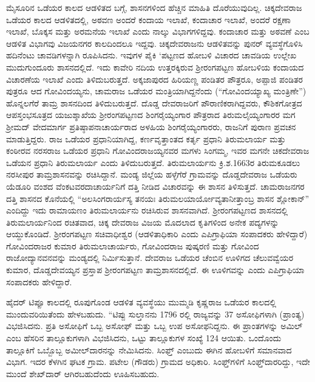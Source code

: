 ಮೈಸೂರಿನ ಒಡೆಯರ ಕಾಲದ ಆಡಳಿತದ ಬಗ್ಗೆ, ಶಾಸನಗಳಿಂದ ಹೆಚ್ಚಿನ ಮಾಹಿತಿ ದೊರೆಯುವುದಿಲ್ಲ. ಚಿಕ್ಕದೇವರಾಜ ಒಡೆಯರ ಕಾಲದ ಆಡಳಿತದಲ್ಲಿ, ಅಠವಣ ಅಂದರೆ ಕಂದಾಯ ಇಲಾಖೆ, ಕಂದಾಚಾರ ಇಲಾಖೆ, ಅಂದರೆ ರಕ್ಷಣಾ ಇಲಾಖೆ, ಬೊಕ್ಕಸ ಮತ್ತು ಅರಮನೆಯ ಇಲಾಖೆ ಎಂದು ನಾಲ್ಕು ವಿಭಾಗಗಳಿದ್ದವು. ಕಂದಾಚಾರ ಮತ್ತು ಅಠವಣೆ ಎಂಬ ಆಡಳಿತ ವಿಭಾಗವು ವಿಜಯನಗರ ಕಾಲದಿಂದಲೂ ಇದ್ದವು. ಚಿಕ್ಕದೇವರಾಜನು ಆಡಳಿತವನ್ನು ಪುನರ್​ ವ್ಯವಸ್ಥೆಗೊಳಿಸಿ ಹದಿನೆಂಟು ಚಾವಡಿಗಳನ್ನಾಗಿ ರೂಪಿಸಿದನು. ಇವುಗಳ ಪೈಕಿ ‘ಪಟ್ಟಣದ ಹೋಬಳಿ ವಿಚಾರದ ಚಾವಡಿಯ ಉಲ್ಲೇಖ ಮುದುಗುಂದೂರು ಶಾಸನದಲ್ಲಿದೆ. ಇದು ಕಾವೇರಿ ನದಿಯ ಉತ್ತರಕ್ಕಿರುವ ಶ‍್ರೀರಂಗಪಟ್ಟಣ ಹೋಬಳಿಯ ಕಂದಾಯದ ವಿಚಾರಣೆಯ ಇಲಾಖೆ ಎಂದು ತಿಳಿದುಬರುತ್ತದೆ. ಅಕ್ಕಜಾಪುರದ ಹಿರಿಯಣ್ಣ ಪಂಡಿತರ ಪೌತ್ರರೂ, ಅಪ್ಪಾಜಿ ಪಂಡಿತರ ಪುತ್ರರೂ ಆದ ಗೋವಿಂದಯ್ಯನು, ಚಾಮರಾಜ ಒಡೆಯರ ಮಂತ್ರಿಯಾಗಿದ್ದನೆಂದು (“ಗೋವಿಂದಯ್ಯಾಖ್ಯ ಮಂತ್ರಿಣೇ”) ಹೊನ್ನಲಗೆರೆ ತಾಮ್ರ ಶಾಸನದಿಂದ ತಿಳಿದುಬರುತ್ತದೆ. ದೊಡ್ಡ ದೇವರಾಜರಿಗೆ ಪೌರಾಣಿಕರಾಗಿದ್ದವರು, ಕೌಶಿಕಗೋತ್ರದ ಆಪಸ್ತಂಭಸೂತ್ರದ ಯಜುಶ್ಶಾಖೆಯ ಶ‍್ರೀರಂಗಪಟ್ಟಣದ ಶಿಂಗರೈಯ್ಯಂಗಾರ ಪೌತ್ರರಾದ ತಿರುಮಲೈಯ್ಯಂಗಾರರ ಮಗ ಶ‍್ರೀಮದ್​ ವೇದಮಾರ್ಗ ಪ್ರತಿಷ್ಠಾಪನಾಚಾರ್ಯರಾದ ಅಳಹಿಯ ಶಿಂಗರೈಯ್ಯಂಗಾರರು, ರಾಜನಿಗೆ ಪುರಾಣ ಪ್ರವಚನ ಮಾಡುತ್ತಿದ್ದರು. ರಾಜ ಒಡೆಯರ ಪ್ರಧಾನಿಯಾಗಿದ್ದ, ಕರ್ಣವೃತ್ತಾಂತದ ಕರ್ತೃ ಪ್ರಧಾನಿ ತಿರುಮಲಾರ್ಯ ಮತ್ತು ಕಂಠೀರವ ನರಸರಾಜ ಒಡೆಯರ ಪ್ರಧಾನಿ ಗೋವಿಂದರಾಜಯ್ಯನವರ ಮಗಳು ಸಿಂಗಮ್ಮ, ಇವರ ಮಗನೇ ಚಿಕದೇವರಾಜ ಒಡೆಯನ ಪ್ರಧಾನಿ ತಿರುಮಲಾರ್ಯ ಎಂದು ತಿಳಿದುಬರುತ್ತದೆ. ತಿರುಮಲಾರ್ಯನು ಕ್ರಿ.ಶ.1663ರ ತಿರುಮಕೂಡಲು ನರಸೀಪುರ ತಾಮ್ರಶಾಸನವನ್ನು ರಚಿಸಿದ್ದಾನೆ. ಮಂಡ್ಯ ಜಿಲ್ಲೆಯ ಹಳ್ಳೆಗೆರೆ ಗ್ರಾಮವನ್ನು ದೊಡ್ಡದೇವರಾಜ ಒಡೆಯರು ಯೆಡೂರಿ ವಂಶದ ವೆಂಕಟವರದಾಚಾರ್ಯನಿಗೆ ದತ್ತಿ ನೀಡಿದ ವಿಚಾರವನ್ನು ಈ ಶಾಸನ ತಿಳಿಸುತ್ತದೆ. ಚಾಮರಾಜನಗರ ದತ್ತಿ ಶಾಸನದ ಕೊನೆಯಲ್ಲಿ “ಅಲಸಿಂಗರಾರ್ಯಸ್ಯ ತನಯಃ ತಿರುಮಲಯಾರ್ಯೋವ್ಯತಾನೀತ್ತಾಂಬ್ರ ಶಾಸನ ಶ್ಲೋಕಾನ್​” ಎಂದಿದ್ದು ಇದು ರಾಮಾಯಣಂ ತಿರುಮಲಾರ್ಯನು ರಚಿಸಿರುವ ಶಾಸನವಾಗಿದೆ. ಶ‍್ರೀರಂಗಪಟ್ಟಣದ ಶಾಸನದಲ್ಲಿ ತಿರುಮಲಾರ್ಯನಿಂದ ರಚಿತವಾದ, ಚಿಕ್ಕ ದೇವರಾಜ ವಿಜಯ ಮೊದಲಾದ ಕೃತಿಗಳಿಂದ ಅನೇಕ ಪದ್ಯಗಳನ್ನು ಆಯ್ದುಕೊಂಡಿದೆ. ಶ‍್ರೀರಂಗಪಟ್ಟಣ ಸಚಿವಾಧೀಶ್ವರ (ಆಡಳಿತಾಧಿಕಾರಿ ಎಂದು ಎಪಿಗ್ರಾಫಿಯಾ ಸಂಪಾದಕರು ಹೇಳಿದ್ದಾರೆ) ಗೋವಿಂದರಾಜರ ಕುಮಾರ ತಿರುಮಲಾಚಾರ್ಯರು, ಗೋವಿಂದರಾಜ ಪುಷ್ಕರಣಿ ಮತ್ತು ಗೋವಿಂದ ರಾಜೋದ್ಯಾನವನವನ್ನು ಮಂಡ್ಯದಲ್ಲಿ ನಿರ್ಮಿಸುತ್ತಾನೆ. ದೇವರಾಜ ಒಡೆಯರ ಚೆಂಬಿನ ಊಳಿಗದ ಚೆಲುವವ್ವೆಯರ ಕುಮಾರ, ದೊಡ್ಡದೇವಯ್ಯನ ಪ್ರಸ್ತಾಪ ಶ‍್ರೀರಂಗಪಟ್ಟಣ ತಾಮ್ರಶಾಸನದಲ್ಲಿದೆ. ಈ ಊಳಿಗವನ್ನು  ಎಂದು ಎಪಿಗ್ರಾಫಿಯಾ ಸಂಪಾದಕರು ಹೇಳಿದ್ದಾರೆ.

ಹೈದರ್​ ಟಿಪ್ಪೂ ಕಾಲದಲ್ಲಿ ರೂಪುಗೊಂಡ ಆಡಳಿತ ವ್ಯವಸ್ಥೆಯು ಮುಮ್ಮಡಿ ಕೃಷ್ಣರಾಜ ಒಡೆಯರ ಕಾಲದಲ್ಲಿ ಮುಂದುವರಿಯಿ\-ತೆಂದು ಹೇಳಬಹುದು. “ಟಿಪ್ಪು ಸುಲ್ತಾನನು 1796 ರಲ್ಲಿ ರಾಜ್ಯವನ್ನು 37 ಅಸೋಫಿಗಳಾಗಿ (ಪ್ರಾಂತ್ಯ) ವಿಭಜಿಸಿದನು. ಪ್ರತಿ ಅಸೋಫಿಗೆ ಒಬ್ಬ ಅಸೋಫ್​ ಮತ್ತು ಒಬ್ಬ ಉಪ ಅಸೋಫನಿದ್ದನು. ಈ ಪ್ರಾಂತಗಳನ್ನು ಅಮಿಲ್​ ಎಂಬ ಹೆಸರಿನ ತಾಲ್ಲೂಕುಗಳಾಗಿ ವಿಭಜಿಸಿದನು, ಒಟ್ಟು ತಾಲ್ಲೂಕುಗಳ ಸಂಖ್ಯೆ 124 ಆಯಿತು. ಒಂದೊಂದು ತಾಲ್ಲೂಕಿಗೆ ಒಬ್ಬೊಬ್ಬ ಅಮೀಲ್​ದಾರನನ್ನು ನೇಮಿಸಿದನು. ಸಿಂಫ್ತ್​ ಎಂಬುದು ಈಗಿನ ಹೋಬಳಿಗೆ ಸಮಾನವಾದ ವಿಭಾಗ. ಇದರ ಕೆಳಗಿನ ಘಟಕ ಗ್ರಾಮ. ಪಟೇಲ (ಗೌಡರು) ಗ್ರಾಮದ ಅಧಿಕಾರಿ. ಸಿಂಫ್ತ್​ಗಳಿಗೆ ಸಿಂಫ್ತ್​ದಾರರಿದ್ದು, ಇದೇ ಮುಂದೆ ಶೇಖ್​ದಾರ್​ ಆಗಿರಬಹುದೆಂದು ಊಹಿಸಬಹುದು.

